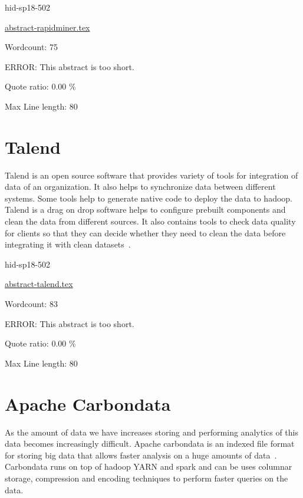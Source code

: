 \begin{IU}

hid-sp18-502

\href{https://github.com/cloudmesh-community/hid-sp18-502/blob/master//technology/abstract-rapidminer.tex}{abstract-rapidminer.tex}

 

Wordcount: 75

ERROR: This abstract is too short.


Quote ratio: 0.00 \%
 
Max Line length: 80
\end{IU}

\section{Talend}

Talend is an open source software that provides variety of tools for integration
 of data of an organization. It also helps to synchronize data between different
 systems. Some tools help to generate native code to deploy the data to hadoop.
Talend is a drag on drop software helps to configure prebuilt components and
clean the data from different sources. It also contains tools to check data
quality for clients so that they can decide whether they need to clean the data
before integrating it with clean datasets~\cite{hid-sp18-502-Talend}.




\begin{IU}

hid-sp18-502

\href{https://github.com/cloudmesh-community/hid-sp18-502/blob/master//technology/abstract-talend.tex}{abstract-talend.tex}

 

Wordcount: 83

ERROR: This abstract is too short.


Quote ratio: 0.00 \%
 
Max Line length: 80
\end{IU}

\section{Apache Carbondata}

As the amount of data we have increases storing and performing
analytics of this data becomes increasingly difficult.
Apache carbondata is an indexed file format for storing big data
that allows faster analysis on a huge amounts of 
data~\cite{hid-sp18-503-www-carbondata-docs}. 
Carbondata runs on top of hadoop YARN
and spark and can be uses columnar storage, compression and
encoding techniques to perform faster queries on the data.

